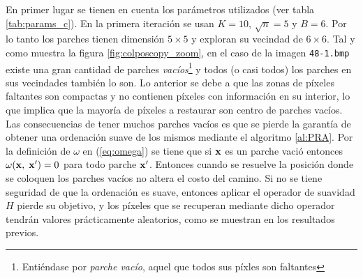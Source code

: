  En primer lugar se tienen en cuenta los par\'ametros utilizados (ver tabla \ref{tab:params_c}). En la primera iteraci\'on se usan $K=10$, $\sqrt{n}=5$ y $B=6$. Por lo tanto los parches tienen dimensi\'on $5 \times 5$ y exploran su vecindad de $6 \times 6$. Tal y como muestra la figura \ref{fig:colposcopy_zoom}, en el caso de la imagen \texttt{48-1.bmp} existe una gran cantidad de parches \textit{vac\'ios}\footnote{Enti\'endase por \textit{parche vac\'io}, aquel que todos sus p\'ixles son faltantes} y todos (o casi todos) los parches en sus vecindades tambi\'en lo son. Lo anterior se debe a que las zonas de p\'ixeles faltantes son compactas y no contienen p\'ixeles con informaci\'on en su interior, lo que implica que la mayor\'ia de p\'ixeles a restaurar son centro de parches vac\'ios. Las consecuencias de tener muchos parches vac\'ios es que se pierde la garant\'ia de obtener una ordenaci\'on suave de los mismos mediante el algoritmo \ref{al:PRA}. Por la definici\'on de $\omega$ en (\ref{eq:omega}) se tiene que si $\mathbf{x}$ es un parche vaci\'o entonces $\omega(\mathbf{x},\; \mathbf{x}') = 0$ para todo parche $\mathbf{x}'$. Entonces cuando se resuelve \TSP la posici\'on donde se coloquen los parches vac\'ios no altera el costo del camino. Si no se tiene seguridad de que la ordenaci\'on es suave, entonces aplicar el operador de suavidad $H$ pierde su objetivo, y los p\'ixeles que se recuperan mediante dicho operador tendr\'an valores pr\'acticamente aleatorios, como se muestran en los resultados previos.
 
